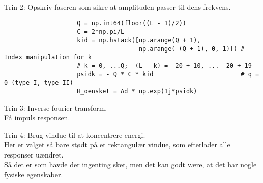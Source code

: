 \begin{Opgaver}
\begin{kapitel}
\begin{Opgave}[Opgave 10.11 - Consider an ideal lowpass filter with cutoff frequency \text{$w_c = \pi/2$}]
\begin{UnderOpgave}[Using L = 20 samples around the unit circle, compute the resulting impulse response hn using the rectangular window.]
                Trin 2: Opskriv faseren som sikre at amplituden passer til dens frekvens. 
                \begin{verbatim}
                    Q = np.int64(floor((L - 1)/2))
                    C = 2*np.pi/L 
                    kid = np.hstack([np.arange(Q + 1), 
                                     np.arange(-(Q + 1), 0, 1)]) # Index manipulation for k
                    # k = 0, ...Q; -(L - k) = -20 + 10, ... -20 + 19 
                    psidk = - Q * C * kid                        # q = 0 (type I, type II)
                    H_oensket = Ad * np.exp(1j*psidk)
                \end{verbatim}
                Trin 3: Inverse fourier transform. \\
                Få impuls responsen. 

                Trin 4: Brug vindue til at koncentrere energi. \\
                Her er valget så bare stødt på et rektangulær vindue, som efterlader alle responser uændret. \\
                Så det er som havde der ingenting sket, men det kan godt være, at det har nogle fysiske egenskaber. \\


\end{UnderOpgave}
\end{Opgave}
\end{kapitel}
\end{Opgaver}

